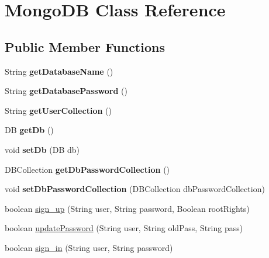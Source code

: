\hypertarget{class_mongo_d_b}{}\section{Mongo\+DB Class Reference}
\label{class_mongo_d_b}
\subsection*{Public Member Functions}
\begin{DoxyCompactItemize}
\item 
\mbox{\label{class_mongo_d_b_a5e60a5605d070637ce60a3dc4e67138a}} 
String {\bfseries get\+Database\+Name} ()
\item 
\mbox{\label{class_mongo_d_b_a86a8fe83d594dc26f709b9e048c79fe6}} 
String {\bfseries get\+Database\+Password} ()
\item 
\mbox{\label{class_mongo_d_b_adf1dfa43d61be69c1673bb8ddfeb210e}} 
String {\bfseries get\+User\+Collection} ()
\item 
\mbox{\label{class_mongo_d_b_a70007164c403cb52ac8e87b0137aa27e}} 
DB {\bfseries get\+Db} ()
\item 
\mbox{\label{class_mongo_d_b_afa9b1ff69f975af22fdff7860c600c8e}} 
void {\bfseries set\+Db} (DB db)
\item 
\mbox{\label{class_mongo_d_b_aa46409219a8b26d1b0a229e464be7258}} 
D\+B\+Collection {\bfseries get\+Db\+Password\+Collection} ()
\item 
\mbox{\label{class_mongo_d_b_a54e2ada48adc6b47a40d5092113b2369}} 
void {\bfseries set\+Db\+Password\+Collection} (D\+B\+Collection db\+Password\+Collection)
\item 
boolean \hyperlink{class_mongo_d_b_a9c69be7c091bffc9d1950e118fdb2251}{sign\+\_\+up} (String user, String password, Boolean root\+Rights)
\item 
boolean \hyperlink{class_mongo_d_b_a43b2b812eb5b88c87d2c3e2b100ae74b}{update\+Password} (String user, String old\+Pass, String pass)
\item 
boolean \hyperlink{class_mongo_d_b_a672df0039a1fcd302bd399089bb7fe28}{sign\+\_\+in} (String user, String password)

\end{DoxyCompactItemize}

